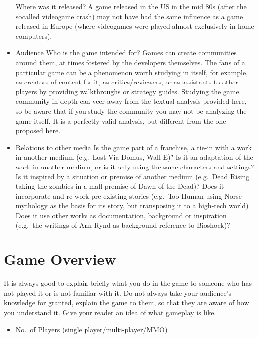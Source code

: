 \documentclass[
]{book}
\providecommand{\tightlist}{%
  \setlength{\itemsep}{0pt}\setlength{\parskip}{0pt}}
\begin{document}
\begin{itemize}
  Where was it released? A game released in the US in the mid 80s (after the socalled videogame crash) may not have had the same influence as a game released
  in Europe (where videogames were played almost exclusively in home
  computers).
\item
  Audience
  Who is the game intended for? Games can create communities around them, at
  times fostered by the developers themselves. The fans of a particular game can be
  a phenomenon worth studying in itself, for example, as creators of content for it,
  as critics/reviewers, or as assistants to other players by providing walkthroughs
  or strategy guides. Studying the game community in depth can veer away from
  the textual analysis provided here, so be aware that if you study the community
  you may not be analyzing the game itself. It is a perfectly valid analysis, but
  different from the one proposed here.
\item
  Relations to other media
  Is the game part of a franchise, a tie-in with a work in another medium (e.g.~Lost Via Domus, Wall-E)? Is it an adaptation of the work in another medium, or is it
  only using the same characters and settings? Is it inspired by a situation or
  premise of another medium (e.g.~Dead Rising taking the zombies-in-a-mall
  premise of Dawn of the Dead)? Does it incorporate and re-work pre-existing
  stories (e.g.~Too Human using Norse mythology as the basis for its story, but
  transposing it to a high-tech world) Does it use other works as documentation,
  background or inspiration (e.g.~the writings of Ann Rynd as background
  reference to Bioshock)?
\end{itemize}

\hypertarget{game-overview}{%
\section{Game Overview}\label{game-overview}}

It is always good to explain briefly what you do in the game to someone who has
not played it or is not familiar with it. Do not always take your audience's
knowledge for granted, explain the game to them, so that they are aware of how
you understand it. Give your reader an idea of what gameplay is like.

\begin{itemize}
\tightlist
\item
  No.~of Players (single player/multi-player/MMO)
\end{itemize}
\end{document}
